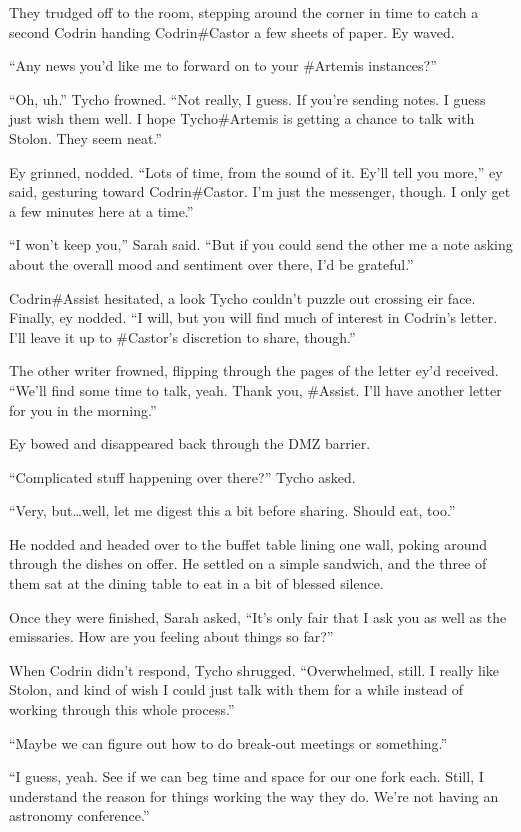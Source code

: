 They trudged off to the room, stepping around the corner in time to catch a second Codrin handing Codrin\#Castor a few sheets of paper. Ey waved.

``Any news you'd like me to forward on to your \#Artemis instances?''

``Oh, uh.'' Tycho frowned. ``Not really, I guess. If you're sending notes. I guess just wish them well. I hope Tycho\#Artemis is getting a chance to talk with Stolon. They seem neat.''

Ey grinned, nodded. ``Lots of time, from the sound of it. Ey'll tell you more,'' ey said, gesturing toward Codrin\#Castor. I'm just the messenger, though. I only get a few minutes here at a time.''

``I won't keep you,'' Sarah said. ``But if you could send the other me a note asking about the overall mood and sentiment over there, I'd be grateful.''

Codrin\#Assist hesitated, a look Tycho couldn't puzzle out crossing eir face. Finally, ey nodded. ``I will, but you will find much of interest in Codrin's letter. I'll leave it up to \#Castor's discretion to share, though.''

The other writer frowned, flipping through the pages of the letter ey'd received. ``We'll find some time to talk, yeah. Thank you, \#Assist. I'll have another letter for you in the morning.''

Ey bowed and disappeared back through the DMZ barrier.

``Complicated stuff happening over there?'' Tycho asked.

``Very, but\ldots well, let me digest this a bit before sharing. Should eat, too.''

He nodded and headed over to the buffet table lining one wall, poking around through the dishes on offer. He settled on a simple sandwich, and the three of them sat at the dining table to eat in a bit of blessed silence.

Once they were finished, Sarah asked, ``It's only fair that I ask you as well as the emissaries. How are you feeling about things so far?''

When Codrin didn't respond, Tycho shrugged. ``Overwhelmed, still. I really like Stolon, and kind of wish I could just talk with them for a while instead of working through this whole process.''

``Maybe we can figure out how to do break-out meetings or something.''

``I guess, yeah. See if we can beg time and space for our one fork each. Still, I understand the reason for things working the way they do. We're not having an astronomy conference.''


